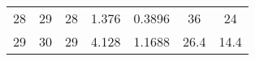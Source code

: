 \begin{table}[]
\begin{tabular}{@{}ccccccc@{}}
28                                                           & 29                                                              & 28                                                   & 1.376                                                                           & 0.3896                                                                        & 36                                                                              & 24                                                                                   \\
29                                                           & 30                                                              & 29                                                   & 4.128                                                                           & 1.1688                                                                        & 26.4                                                                            & 14.4                                                                                 \\ \bottomrule
\end{tabular}
\end{table}

